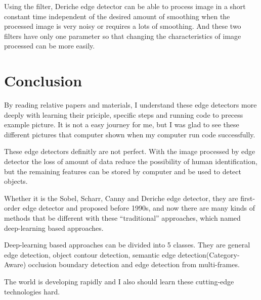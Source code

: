 \documentclass[10pt,twocolumn,letterpaper]{article}
\begin{document}
Using the filter, Deriche edge detector can be able to process image in a short 
constant time independent of the desired amount of smoothing when the processed 
image is very noisy or requires a lots of smoothing. And these two filters have 
only one parameter so that changing the characteristics of image processed can 
be more easily. 

\section{Conclusion}

By reading relative papers and materials, I understand these edge detectors more 
deeply with learning their priciple, specific steps and running code to precess 
example picture. It is not a easy journey for me, but I was glad to see these 
different pictures that computer shown when my computer run code successfully. 

These edge detectors definitly are not perfect. With the image processed by 
edge detector the loss of amount of data reduce the possibility of human 
identification, but the remaining features can be stored by computer and be used 
to detect objects. 

Whether it is the Sobel, Scharr, Canny and Deriche edge detector, they are 
first-order edge detector and proposed before 1990s, and now there are many kinds 
of methods that be different with these ``traditional'' approaches, which named 
deep-learning based approaches. 

Deep-learning based approaches can be divided into 5 classes. They are general 
edge detection, object contour detection, semantic edge detection(Category-Aware) 
occlusion boundary detection and edge detection from multi-frames.\cite{ref13} 

The world is developing rapidly and I also should learn these cutting-edge 
technologies hard.

\end{document}
